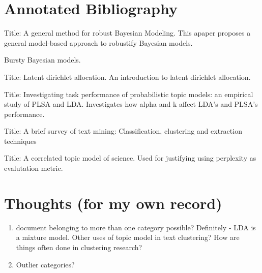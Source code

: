 \documentclass{article}
\begin{document}
\section{Annotated Bibliography}
\cite{wang2018general}
Title: A general method for robust Bayesian Modeling.
This apaper proposes a general model-based approach to robustify Bayesian models.

\cite{doyle2009accounting}
Bursty Bayesian models.

\cite{blei2003latent}
Title: Latent dirichlet allocation.
An introduction to latent dirichlet allocation.

\cite{lu2011investigating}
Title: Investigating task performance of probabilistic topic models: an empirical study of PLSA and LDA. Investigates how alpha and k affect LDA's and PLSA's performance.

\cite{allahyari2017brief}
Title: A brief survey of text mining: Classification, clustering and extraction techniques

\cite{blei2007correlated}
Title: A correlated topic model of science. Used for justifying using perplexity as evalutation metric.


\section{Thoughts (for my own record)}

\begin{enumerate}
  \item document belonging to more than one category possible? Definitely - LDA is a mixture model. Other uses of topic model in text clustering? How are things often done in clustering research? 
  \item Outlier categories?
\end{enumerate}




\end{document}
